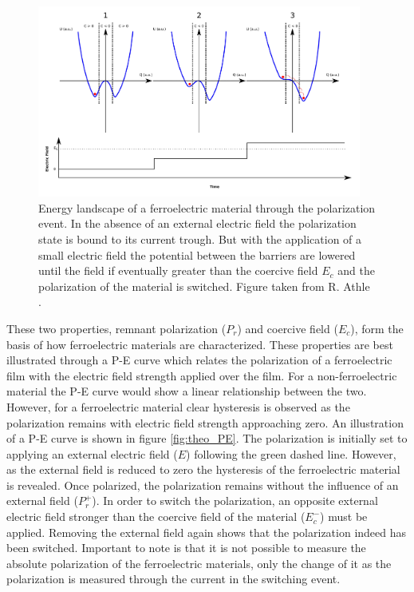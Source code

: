 \documentclass[11pt,twoside]{eitExjobb}
\begin{document}
\begin{figure}[htbp]
    \centering
    \includegraphics[width=0.95\textwidth]{fig/img/coercivefield.png}
    \caption{Energy landscape of a ferroelectric material through the
    polarization event. In the absence of an external electric field the
    polarization state is bound to its current trough. But with the application
    of a small electric field the potential between the barriers are lowered until
    the field if eventually greater than the coercive field $E_c$ and the
    polarization of the material is switched. Figure taken from R. Athle
    \cite{athle2019development}.}
    \label{fig:theo_Ec}
\end{figure}

These two properties, remnant polarization ($P_r$) and coercive field ($E_c$),
form the basis of how ferroelectric materials are characterized. These
properties are best illustrated through a P-E curve which relates the
polarization of a ferroelectric film with the electric field strength applied
over the film. For a non-ferroelectric material the P-E curve would show a
linear relationship between the two. However, for a ferroelectric material clear
hysteresis is observed as the polarization remains with electric field
strength approaching zero. An illustration of a P-E curve is shown in figure
\ref{fig:theo_PE}. The polarization is initially set to applying an external
electric field ($E$) following the green dashed line. However, as the external
field is reduced to zero the hysteresis of the ferroelectric material is
revealed. Once polarized, the polarization remains without the influence of an
external field ($P_r^+$). In order to switch the polarization, an opposite
external electric field stronger than the coercive field of the
material ($E_c^-$) must be applied. Removing the external field again shows
that the polarization indeed has been switched. Important to note is that it is
not possible to measure the absolute polarization of the ferroelectric
materials, only the change of it as the polarization is measured through the
current in the switching event.
\end{document}
